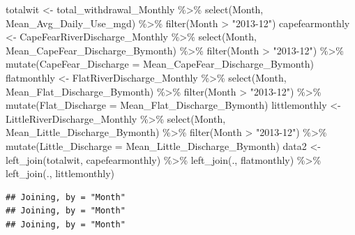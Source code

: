 \documentclass[
  12pt,
]{article}
\newenvironment{Shaded}{\begin{snugshade}}{\end{snugshade}}
\newcommand{\AttributeTok}[1]{\textcolor[rgb]{0.77,0.63,0.00}{#1}}
\newcommand{\FunctionTok}[1]{\textcolor[rgb]{0.00,0.00,0.00}{#1}}
\newcommand{\NormalTok}[1]{#1}
\newcommand{\OtherTok}[1]{\textcolor[rgb]{0.56,0.35,0.01}{#1}}
\newcommand{\SpecialCharTok}[1]{\textcolor[rgb]{0.00,0.00,0.00}{#1}}
\newcommand{\StringTok}[1]{\textcolor[rgb]{0.31,0.60,0.02}{#1}}
\begin{document}
\begin{Shaded}
\begin{Highlighting}[]
\NormalTok{totalwit }\OtherTok{\textless{}{-}}\NormalTok{ total\_withdrawal\_Monthly }\SpecialCharTok{\%\textgreater{}\%}
  \FunctionTok{select}\NormalTok{(Month, Mean\_Avg\_Daily\_Use\_mgd) }\SpecialCharTok{\%\textgreater{}\%}
  \FunctionTok{filter}\NormalTok{(Month }\SpecialCharTok{\textgreater{}} \StringTok{"2013{-}12"}\NormalTok{) }
\NormalTok{capefearmonthly }\OtherTok{\textless{}{-}}\NormalTok{ CapeFearRiverDischarge\_Monthly }\SpecialCharTok{\%\textgreater{}\%}
  \FunctionTok{select}\NormalTok{(Month, Mean\_CapeFear\_Discharge\_Bymonth) }\SpecialCharTok{\%\textgreater{}\%}
  \FunctionTok{filter}\NormalTok{(Month }\SpecialCharTok{\textgreater{}} \StringTok{"2013{-}12"}\NormalTok{) }\SpecialCharTok{\%\textgreater{}\%}
  \FunctionTok{mutate}\NormalTok{(}\AttributeTok{CapeFear\_Discharge =}\NormalTok{ Mean\_CapeFear\_Discharge\_Bymonth)}
\NormalTok{flatmonthly }\OtherTok{\textless{}{-}}\NormalTok{ FlatRiverDischarge\_Monthly }\SpecialCharTok{\%\textgreater{}\%}
  \FunctionTok{select}\NormalTok{(Month, Mean\_Flat\_Discharge\_Bymonth) }\SpecialCharTok{\%\textgreater{}\%}
  \FunctionTok{filter}\NormalTok{(Month }\SpecialCharTok{\textgreater{}} \StringTok{"2013{-}12"}\NormalTok{) }\SpecialCharTok{\%\textgreater{}\%}
  \FunctionTok{mutate}\NormalTok{(}\AttributeTok{Flat\_Discharge =}\NormalTok{ Mean\_Flat\_Discharge\_Bymonth)}
\NormalTok{littlemonthly }\OtherTok{\textless{}{-}}\NormalTok{ LittleRiverDischarge\_Monthly }\SpecialCharTok{\%\textgreater{}\%}
  \FunctionTok{select}\NormalTok{(Month, Mean\_Little\_Discharge\_Bymonth) }\SpecialCharTok{\%\textgreater{}\%}
  \FunctionTok{filter}\NormalTok{(Month }\SpecialCharTok{\textgreater{}} \StringTok{"2013{-}12"}\NormalTok{) }\SpecialCharTok{\%\textgreater{}\%}
  \FunctionTok{mutate}\NormalTok{(}\AttributeTok{Little\_Discharge =}\NormalTok{ Mean\_Little\_Discharge\_Bymonth)}
\NormalTok{data2 }\OtherTok{\textless{}{-}} \FunctionTok{left\_join}\NormalTok{(totalwit, capefearmonthly) }\SpecialCharTok{\%\textgreater{}\%}
  \FunctionTok{left\_join}\NormalTok{(., flatmonthly) }\SpecialCharTok{\%\textgreater{}\%}
  \FunctionTok{left\_join}\NormalTok{(., littlemonthly) }
\end{Highlighting}
\end{Shaded}

\begin{verbatim}
## Joining, by = "Month"
## Joining, by = "Month"
## Joining, by = "Month"
\end{verbatim}
\end{document}
